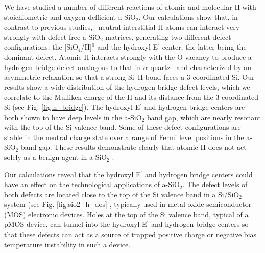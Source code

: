 \documentclass[aps,prb,reprint,superscriptaddress,showpacs]{revtex4-1}
\providecommand{\DIFadd}[1]{{\protect\color{blue}\uwave{#1}}} %
\providecommand{\DIFaddbegin}{} %
\providecommand{\DIFaddend}{} %
\providecommand{\DIFdelbegin}{} %
\providecommand{\DIFdelend}{} %
\begin{document}
We have studied a number of different reactions of atomic and molecular H with stoichiometric and oxygen defficient a-SiO$_2$. Our calculations show that, in contrast to previous studies,~\cite{blochl_vacancies,robertson_oxides,godet_hydrogen} neutral interstitial H atoms can interact very strongly with defect-free a-SiO$_2$ matrices, generating two different defect configurations: the [SiO$_4$/H]$^0$ and the hydroxyl E$^\prime$ center, the latter being the dominant defect. Atomic H interacts strongly with the O vacancy to produce a hydrogen bridge defect analogous to that in $\alpha$-quartz~\cite{blochl_vacancies} and characterized by an asymmetric relaxation so that a strong \mbox{Si--H} bond faces a 3-coordinated Si. Our results show a wide distribution of the hydrogen bridge defect levels, which we correlate to the Mulliken charge of the H and its distance from the 3-coordinated Si (see Fig. \ref{fig:h_bridge}). The hydroxyl E$^\prime$ and hydrogen bridge centers are both shown to have deep levels in the a-SiO$_2$ band gap, which are nearly resonant with the top of the Si valence band. Some of these defect configurations are stable in the neutral charge state over a range of Fermi level positions in the a-SiO$_2$ band gap. These results demonstrate clearly that atomic H does not act solely as a benign agent in a-SiO$_2$ \DIFaddbegin \DIFadd{at room and elevated temperatures}\DIFaddend .

Our calculations reveal that the hydroxyl E$^\prime$ and hydrogen bridge centers could have an effect on the technological applications of a-SiO$_2$. The defect levels of both defects are located close to the top of the Si valence band in a Si/SiO$_2$ system (see Fig. \ref{fig:sio2_h_dos}\DIFdelbegin %
\DIFdelend \DIFaddbegin \DIFadd{)}\DIFaddend , typically used in metal-oxide-semiconductor (MOS) electronic devices. Holes at the top of the Si valence band, typical of a pMOS device, can tunnel into the hydroxyl E$^\prime$ and hydrogen bridge centers so that these defects can act as a source of trapped positive charge or negative bias temperature instability in such a device.
\end{document}
